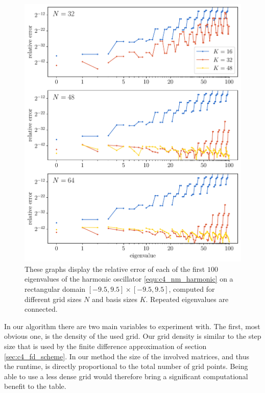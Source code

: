 \begin{figure}
    \begin{center}
        \includegraphics[width=\textwidth]{img/chapter4/nm_test_harmonic.pdf}
    \end{center}
    \caption{These graphs display the relative error of each of the first $100$ eigenvalues of the harmonic oscillator \eqref{equ:c4_nm_harmonic} on a rectangular domain $[-9.5,9.5]\times[-9.5, 9.5]$, computed for different grid sizes $N$ and basis sizes $K$. Repeated eigenvalues are connected.}
    \label{fig:c4_nm_harmonic_rectangle}
\end{figure}

In our algorithm there are two main variables to experiment with. The first, most obvious one, is the density of the used grid. Our grid density is similar to the step size that is used by the finite difference approximation of section \ref{sec:c4_fd_scheme}. In our method the size of the involved matrices, and thus the runtime, is directly proportional to the total number of grid points. Being able to use a less dense grid would therefore bring a significant computational benefit to the table.

